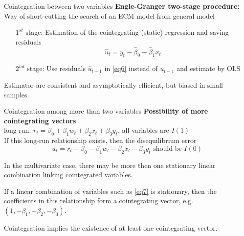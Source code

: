\documentclass{beamer}
\begin{document}

\begin{frame}{Cointegration between two variables}
\textbf{Engle-Granger two-stage procedure:}
\\ Way of short-cutting the search of an ECM model from general model
\begin{itemize}
\item[ $1^{st}$ ]  stage: Estimation of the cointegrating (static) regression and saving residuals $$\hat{u}_t = y_t - \hat{\beta}_0 - \hat{\beta}_1 x_t$$
\item [$2^{nd}$]  stage: Use residuals $\hat{u}_{t-1}$ in \eqref{eq6} instead of $u_{t-1}$ and estimate by OLS
\end{itemize}
Estimator are consistent and asymptotically efficient, but biased in small samples.
\end{frame}


\begin{frame}{Cointegration among more than two variables}
\textbf{Possibility of more cointegrating vectors}\\
long-run: $r_t= \beta_0 + \beta_1 w_t + \beta_2 x_t + \beta_3 y_t$, all variables are $I(1)$\\
If this long-run relationship exists, then the disequilibrium error \\
\begin{equation}  \label{eq7}
u_t= r_t - \beta_0 - \beta_1 w_t - \beta_2 x_t - \beta_3 y_t 
\text{ should be } I(0) 
\end{equation} 

\vspace{0.3cm}
In the multivariate case, there may be more then one stationary linear combination linking cointegrated variables. 

\vspace{0.3cm}
If a linear combination of variables such as \eqref{eq7} is stationary, then the coefficients in this relationship form a cointegrating vector, e.g. $(1,-\beta_{1},-\beta_{2},-\beta_{3})$. 

\vspace{0.3cm} 
Cointegration implies the existence of at least one cointegrating vector.

\end{frame}

\end{document}
